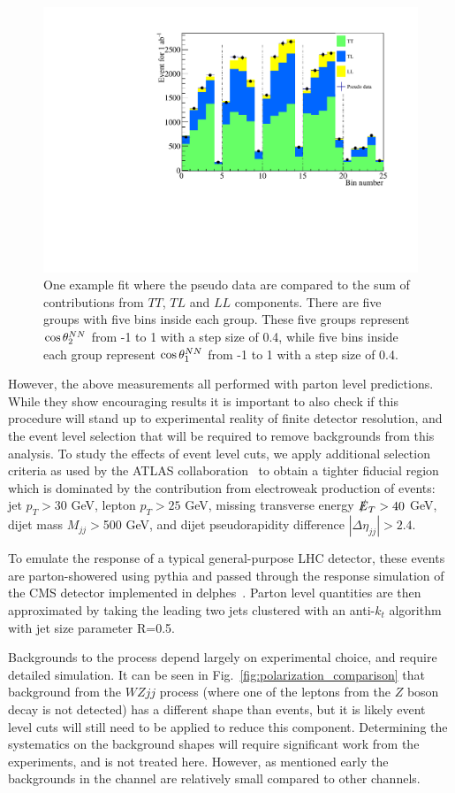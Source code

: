 \begin{figure}[h]
\includegraphics[width=.49\textwidth]{./fig/NN_fit_3.pdf}
\caption{\label{fig:fit_example} One example fit where the pseudo data are compared to the sum of 
contributions from $TT$, $TL$ and $LL$ components. There are five groups with five bins inside each group. 
These five groups represent $ \cos \theta^{NN}  _2$ from -1 to 1 with a step size of 0.4, while five bins inside each group represent $ \cos \theta^{NN}  _1$ from -1 to 1 with a step size of 0.4.}
\end{figure}

However, the above measurements  all performed with parton level predictions. While they show encouraging results  it is important 
to also check if this procedure will stand up to experimental reality of finite detector resolution, and the event level selection that
will be required to remove backgrounds from this analysis. To study the effects of event level cuts, we apply additional selection criteria as used by the ATLAS collaboration~\cite{ATLAS_ssWW} to obtain a
tighter fiducial region which is dominated by the contribution from electroweak production of \ssWW events: jet $p_T > 30$ GeV, lepton $p_T > 25$ GeV, missing transverse energy $\slashed{E}_T > 40$ GeV, 
dijet mass $M_{jj} > $500 GeV, and dijet pseudorapidity difference $|\Delta \eta_{jj}| > 2.4 $. 

To emulate the response of a typical general-purpose LHC detector, these events are parton-showered using {\sc pythia}\cite{pythia} and passed through the  response simulation of the CMS detector implemented in {\sc delphes}~\cite{delphes}. Parton level quantities are then approximated by taking the leading two jets clustered with an anti-$k_t$ algorithm~\cite{antikt} with jet size parameter R=0.5.

Backgrounds to the \ssWW process depend largely on experimental choice, and require detailed simulation. It can be seen in Fig.~\ref{fig:polarization_comparison} that background from the $WZjj$ process (where one of 
the leptons from the $Z$ boson decay is not detected) has a different \ctsNN shape than \ssWW events, but it is likely event level cuts will still need to be applied to reduce this component. Determining the systematics on the background shapes will require significant work from the experiments, and is not treated here. However, as mentioned early the backgrounds in the \ssWW channel are relatively small compared to other channels.

